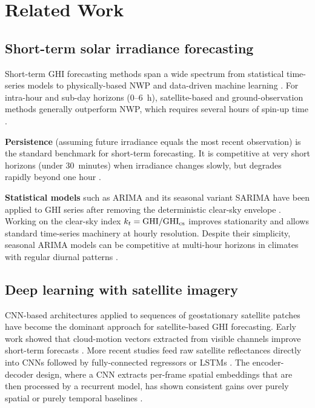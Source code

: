 \section{Related Work}
\label{sec:related}

\subsection{Short-term solar irradiance forecasting}

Short-term GHI forecasting methods span a wide spectrum from statistical time-series
models to physically-based NWP and data-driven machine learning
\cite{diagne2013,voyant2017}. For intra-hour and sub-day horizons (0--6~h),
satellite-based and ground-observation methods generally outperform NWP, which
requires several hours of spin-up time \cite{perez2013}.

\textbf{Persistence} (assuming future irradiance equals the most recent observation)
is the standard benchmark for short-term forecasting. It is competitive at very
short horizons (under 30~minutes) when irradiance changes slowly, but degrades
rapidly beyond one hour \cite{lonij2013}.

\textbf{Statistical models} such as ARIMA and its seasonal variant SARIMA have
been applied to GHI series after removing the deterministic clear-sky envelope
\cite{reikard2009,bacher2009}. Working on the clear-sky index $k_t = \text{GHI}/\text{GHI}_{\text{cs}}$
improves stationarity and allows standard time-series machinery at hourly resolution.
Despite their simplicity, seasonal ARIMA models can be competitive at multi-hour
horizons in climates with regular diurnal patterns \cite{pedro2012}.

\subsection{Deep learning with satellite imagery}

CNN-based architectures applied to sequences of geostationary satellite patches
have become the dominant approach for satellite-based GHI forecasting. Early
work showed that cloud-motion vectors extracted from visible channels improve
short-term forecasts \cite{chow2011}. More recent studies feed raw satellite
reflectances directly into CNNs followed by fully-connected regressors or LSTMs
\cite{huertas2018,paletta2021,feng2022}. The encoder-decoder design, where a CNN
extracts per-frame spatial embeddings that are then processed by a recurrent model,
has shown consistent gains over purely spatial or purely temporal baselines
\cite{wang2019}.

